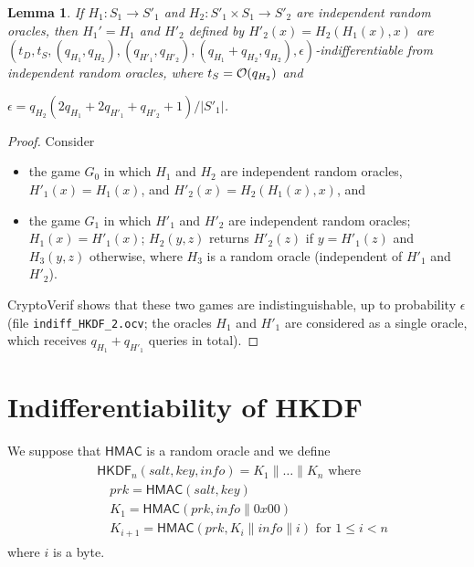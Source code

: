 \documentclass[compsoc, conference, letterpaper, 10pt, times]{IEEEtran}
\newif\ifapproxproba
\newcommand{\HKDF}{\mathsf{HKDF}}
\newtheorem{lemma}{Lemma}
\newcommand{\salt}{\mathit{salt}}
\newcommand{\key}{\mathit{key}}
\newcommand{\info}{\mathit{info}}
\newcommand{\prk}{\mathit{prk}}
\newcommand{\hmac}{\mathsf{HMAC}}
\begin{document}
\begin{lemma}\label{lem:hcomp2}
If $H_1 : S_1 \rightarrow S'_1$ and $H_2 : S'_1 \times S_1 \rightarrow S'_2$ 
are independent random oracles, then $H_1' = H_1$ and $H'_2$ defined by 
$H'_2(x) = H_2(H_1(x),x)$ are $(t_D, t_S, (q_{H_1}, q_{H_2}), (q_{H'_1}, q_{H'_2}), (q_{H_1} + q_{H_2}, q_{H_2}), \epsilon)$-indifferentiable from independent random oracles, where $t_S = {\cal O}(q_{H_2})$ and
\ifapproxproba
$\epsilon = {\cal O}(q_{H_2}(q_{H_1}+q_{H'_1} + q_{H'_2})/|S'_1|)$ and ${\cal O}$ just hides small constants.
\else
$\epsilon = q_{H_2}(2q_{H_1}+2q_{H'_1} + q_{H'_2}+1)/|S'_1|$.
\fi
\end{lemma}
\begin{proof}
Consider
\begin{itemize}[leftmargin=*]
\item  the game $G_0$ in which $H_1$ and $H_2$ are independent random oracles,
  $H'_1(x) = H_1(x)$, and $H'_2(x) = H_2(H_1(x),x)$, and
\item the game $G_1$ in which 
  $H'_1$ and $H'_2$ are independent random oracles;
  $H_1(x) = H'_1(x)$;
  $H_2(y,z)$ returns $H'_2(z)$ if $y = H'_1(z)$ and $H_3(y,z)$ otherwise,
  where $H_3$ is a random oracle (independent of $H'_1$ and $H'_2$).
\end{itemize}
CryptoVerif shows that these two games are indistinguishable,
up to probability $\epsilon$ (file \texttt{indiff\_HKDF\_2.ocv};
the oracles $H_1$ and $H'_1$ are considered as a single oracle,
which receives $q_{H_1}+q_{H'_1}$ queries in total).
\end{proof}

\section{Indifferentiability of HKDF}

We suppose that $\hmac$ is a random oracle and we define
\begin{align*}
\begin{split}
&\HKDF_n(\salt,\key,\info) = K_1 \| \dots \| K_n \text{ where}\\
&\quad \prk = \hmac(\salt,\key)\\
&\quad K_1 = \hmac(\prk, \info \| 0x00)\\
&\quad K_{i+1} = \hmac(\prk, K_i \| \info \| i) \text{ for }1 \leq i < n
\end{split}
\end{align*}
where $i$ is a byte.
\end{document}
